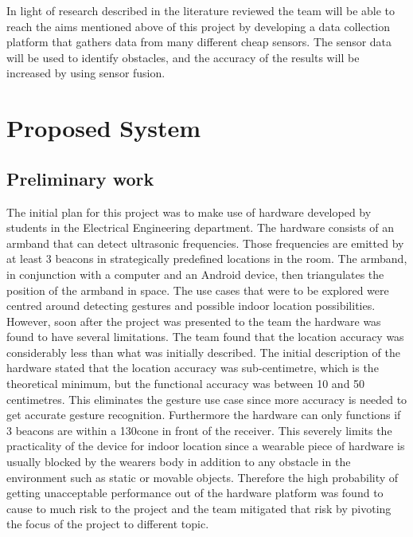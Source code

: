 \documentclass[prodmode,acmtosem]{acmsmall} %
\begin{document}
In light of research described in the literature reviewed the team will be able to reach the aims mentioned above of this project by developing a data collection platform that gathers data from many different cheap sensors. The sensor data will be used to identify obstacles, and the accuracy of the results will be increased by using sensor fusion.



\section{Proposed System}
\subsection{Preliminary work}
\label{sec:Prelim}



The initial plan for this project was to make use of hardware developed by students in the Electrical Engineering department. The hardware consists of an armband that can detect ultrasonic frequencies. Those frequencies are emitted by at least 3 beacons in strategically predefined locations in the room. The armband, in conjunction with a computer and an Android device, then triangulates the position of the armband in space.
The use cases that were to be explored were centred around detecting gestures and possible indoor location possibilities. However, soon after the project was presented to the team the hardware was found to have several limitations. The team found that the location accuracy was considerably less than what was initially described. The initial description of the hardware stated that the location accuracy was sub-centimetre, which is the theoretical minimum, but the functional accuracy was between 10 and 50 centimetres. This eliminates the gesture use case since more accuracy is needed to get accurate gesture recognition.
Furthermore the hardware can only functions if 3 beacons are within a 130\degree cone in front of the receiver. This severely limits the practicality of the device for indoor location since a wearable piece of hardware is usually blocked by the wearers body in addition to any obstacle in the environment such as static or movable objects.
Therefore the high probability of getting unacceptable performance out of the hardware platform was found to cause to much risk to the project and the team mitigated that risk by pivoting the focus of the project to different topic.
\end{document}
